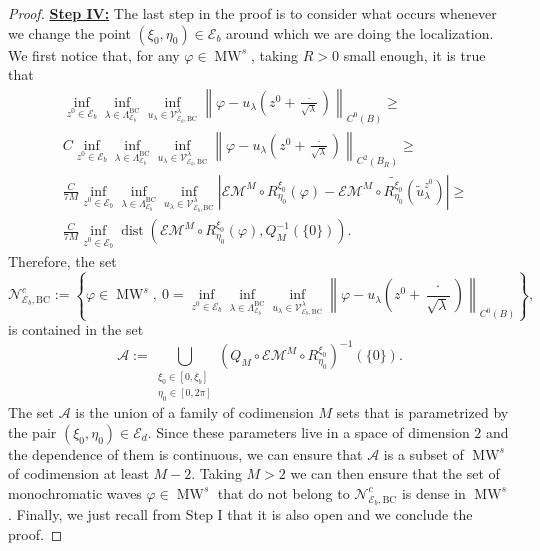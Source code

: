 \documentclass{amsart}
\theoremstyle{definition}
\theoremstyle{remark}
\newcommand{\vp}{\varphi}
\DeclareMathOperator\dist{dist} \DeclareMathOperator\diam{diam}
\renewcommand\geq\geqslant
\numberwithin{equation}{section}
\theoremstyle{definition}
\theoremstyle{remark}
\DeclareMathOperator\MW{MW}
\begin{document}
\begin{proof}
	 \textbf{	\underline{Step IV:}} The last step in the proof is to consider what occurs whenever we change the point $(\xi_0,\eta_0)\in\mathcal{E}_b$ around which we are doing the localization.  We first notice that, for any $\varphi\in \MW^s$, taking $R>0$ small enough, it is true that	\begin{equation}
		\begin{aligned}
			&\inf_{z^0\in\mathcal{E}_b}\inf_{\lambda\in\Lambda_{\mathcal{E}_b}^{\mathrm{BC}}}\inf_{u_\lambda \in\mathcal{V}_{\mathcal{E}_b,\mathrm{BC}}^\lambda}\left\|\varphi-u_\lambda\left(z^0+\frac{\cdot}{\sqrt{\lambda}}\right)\right\|_{C^0\left(B\right)}\geq\\&C\inf_{z^0\in\mathcal{E}_b}\inf_{\lambda\in\Lambda_{\mathcal{E}_b}^{\mathrm{BC}}}\inf_{u_\lambda \in\mathcal{V}_{\mathcal{E}_b,\mathrm{BC}}^\lambda}\left\|\varphi-u_\lambda\left(z^0+\frac{\cdot}{\sqrt{\lambda}}\right)\right\|_{C^2\left(B_R\right)}\geq\\&\frac{C}{7M}\inf_{z^0\in\mathcal{E}_b}\inf_{\lambda\in\Lambda_{\mathcal{E}_b}^{\mathrm{BC}}}\inf_{u_\lambda \in\mathcal{V}_{\mathcal{E}_b,\mathrm{BC}}^\lambda}\left|\mathcal{EM}^M\circ R_{\eta_0}^{\xi_0}\left(\varphi\right)-\mathcal{EM}^M\circ\tilde{R_{\eta_0}^{\xi_0}}\left(\tilde{u}_\lambda^{z^0}\right)\right|\geq\\ &\frac{C}{7M}\inf_{z^0\in\mathcal{E}_b} \dist\left(\mathcal{EM}^M\circ R_{\eta_0}^{\xi_0}(\varphi),Q_M^{-1}\left(\{0\}\right)\right).
		\end{aligned}
	\end{equation}
  Therefore, the set \begin{equation}
      \mathcal{N}_{\mathcal{E}_b,\mathrm{BC}}^c:=\left\{\varphi\in \MW^s,\ 0=\inf_{z^0\in\mathcal{E}_b}\inf_{\lambda\in\Lambda_{\mathcal{E}_b}^{\mathrm{BC}}}\inf_{u_\lambda \in\mathcal{V}_{\mathcal{E}_b,\mathrm{BC}}^\lambda}\left\|\varphi-u_\lambda\left(z^0+\frac{\cdot}{\sqrt{\lambda}}\right)\right\|_{C^0\left(B\right)}\right\},
  \end{equation}is contained in the set \begin{equation}\mathcal{A}:=\bigcup_{\substack{\xi_0\in[0,\xi_b]\\\eta_0\in[0,2\pi]}}\left(Q_M\circ\mathcal{EM}^M\circ R_{\eta_0}^{\xi_0}\right)^{-1}\left(\{0\}\right).\end{equation} The set $\mathcal{A}$ is the union of a family of codimension $M$ sets that is parametrized by the pair $(\xi_0,\eta_0)\in\mathcal{E}_d$. Since these parameters live in a space of dimension $2$ and the dependence of them is continuous, we can ensure that $\mathcal{A}$ is a subset of $\MW^s$ of codimension at least $M-2$. Taking $M>2$ we can then ensure that the set of monochromatic waves $\vp\in\MW^s$ that do not belong to $ \mathcal{N}_{\mathcal{E}_b,\mathrm{BC}}^c$ is dense in $\MW^s$.  Finally, we just recall from Step I that it is also open and we conclude the proof.
	
\end{proof}
\end{document}
